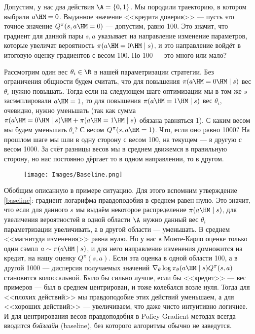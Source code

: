 \begin{example}
Допустим, у нас два действия $\A = \{0, 1\}$. Мы породили траекторию, в котором выбрали $a \HM= 0$. Выданное значение <<кредита доверия>> --- пусть это точное значение $Q^{\pi}(s, a \HM= 0)$ --- допустим, равно 100. Это значит, что градиент для данной пары $s, a$ указывает на направление изменение параметров, которые увеличат вероятность $\pi(a \HM= 0 \HM\mid s)$, и это направление войдёт в итоговую оценку градиентов с весом 100. Но 100 --- это много или мало?

Рассмотрим один вес $\theta_i \in \R$ в нашей параметризации стратегии. Без ограничения общности будем считать, что для повышения $\pi(a \HM= 0 \HM\mid s)$ вес $\theta_i$ нужно повышать. Тогда если на следующем шаге оптимизации мы в том же $s$ засэмплировали $a \HM= 1$, то для повышения $\pi(a \HM= 1 \HM\mid s)$ вес $\theta_i$, очевидно, нужно уменьшать (так как сумма $\pi(a \HM= 0 \HM\mid s) \HM+ \pi(a \HM= 1 \HM\mid s)$ обязана равняться 1). С каким весом мы будем уменьшать $\theta_i$? С весом $Q^{\pi}(s, a \HM= 1)$. Что, если оно равно 1000? На прошлом шаге мы шли в одну сторону с весом 100, на текущем --- в другую с весом 1000. За счёт разницы весов мы в среднем движемся в правильную сторону, но нас постоянно дёргает то в одном направлении, то в другом.
\end{example}

\begin{wrapfigure}{r}{0.3\textwidth}
\vspace{-0.2cm}
\centering
\texttt{[image: Images/Baseline.png]}
\vspace{-1cm}
\end{wrapfigure}

Обобщим описанную в примере ситуацию. Для этого вспомним утверждение \eqref{baseline}: градиент логарифма правдоподобия в среднем равен нулю. Это значит, что если для данного $s$ мы выдаём некоторое распределение $\pi(a \HM\mid s)$, для увеличения вероятностей в одной области $\A$ нужно данный вес $\theta_i$ параметризации увеличивать, а в другой области --- уменьшать. В среднем <<магнитуда изменения>> равна нулю. Но у нас в Монте-Карло оценке только один сэмпл $a \sim \pi(a \HM\mid s)$, и для него направление изменения домножится на кредит, на нашу оценку $Q^{\pi}(s, a)$. Если эта оценка в одной области 100, а в другой 1000 --- дисперсия получаемых значений $\nabla_\theta \log \pi_\theta(a \HM\mid s) Q^{\pi}(s, a)$ становится колоссальной. Было бы сильно лучше, если бы <<кредит>> --- вес примеров --- был в среднем центрирован, и тоже колебался возле нуля. Тогда для <<плохих действий>> мы правдоподобие этих действий уменьшаем, а для <<хороших действий>> --- увеличиваем, что даже чисто интуитивно логичнее. И для центрирования весов правдоподобия в Policy Gradient методах всегда вводится \emph{бэйзлайн} (baseline), без которого алгоритмы обычно не заведутся.


